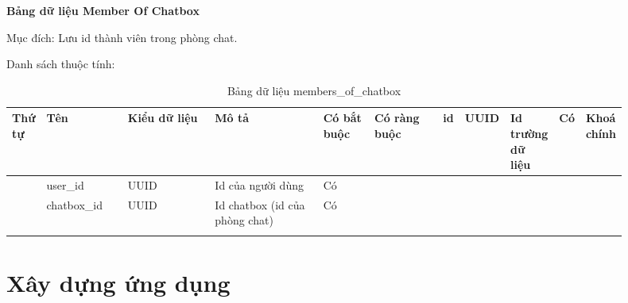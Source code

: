 \documentclass[../DoAn.tex]{subfiles}
\begin{document}
\newpage
\textbf{Bảng dữ liệu Member Of Chatbox}

Mục đích: Lưu id thành viên trong phòng chat.

Danh sách thuộc tính:
\begin{longtable}[c]{
|>{\raggedright\arraybackslash}m{0.05\linewidth}
|>{\raggedright\arraybackslash}m{0.15\linewidth}
|>{\raggedright\arraybackslash}m{0.20\linewidth}
|>{\raggedright\arraybackslash}m{0.25\linewidth}
|>{\raggedright\arraybackslash}m{0.1\linewidth}
|>{\raggedright\arraybackslash}m{0.15\linewidth}|}
\hline
\textbf{Thứ tự} & \textbf{Tên} & \textbf{Kiểu dữ liệu} & \textbf{Mô tả} & \textbf{Có bắt buộc} & \textbf{Có ràng buộc} \hline
{} & id & UUID & Id trường dữ liệu & Có & Khoá chính \\  & user\_id & UUID & Id của người dùng & Có & \\  & chatbox\_id & UUID & Id chatbox (id của phòng chat) & Có & \\ \hline
\caption{Bảng dữ liệu members\_of\_chatbox}
\label{tab:use_case_tổng_quan}
\end{longtable}

\section{Xây dựng ứng dụng}
\end{document}
